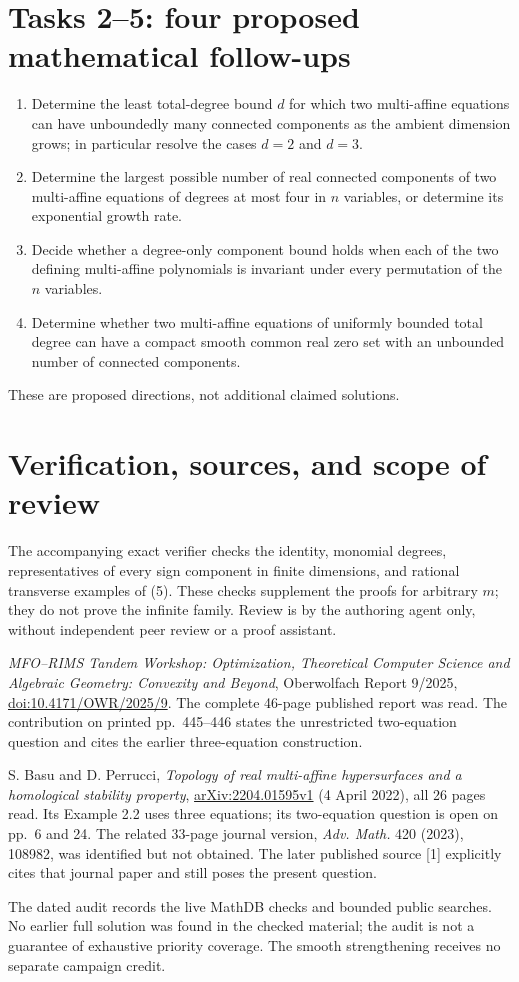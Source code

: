 \documentclass[11pt]{article}
\begin{document}
\section*{Tasks 2--5: four proposed mathematical follow-ups}
\begin{enumerate}[label=\textbf{Task \arabic*:},start=2,leftmargin=*]
\item Determine the least total-degree bound \(d\) for which two
multi-affine equations can have unboundedly many connected
components as the ambient dimension grows; in particular resolve
the cases \(d=2\) and \(d=3\).
\item Determine the largest possible number of real connected
components of two multi-affine equations of degrees at most four
in \(n\) variables, or determine its exponential growth rate.
\item Decide whether a degree-only component bound holds when
each of the two defining multi-affine polynomials is invariant
under every permutation of the \(n\) variables.
\item Determine whether two multi-affine equations of uniformly
bounded total degree can have a compact smooth common real zero
set with an unbounded number of connected components.
\end{enumerate}
These are proposed directions, not additional claimed solutions.

\section*{Verification, sources, and scope of review}
The accompanying exact verifier checks the identity, monomial
degrees, representatives of every sign component in finite
dimensions, and rational transverse examples of (5). These checks
supplement the proofs for arbitrary \(m\); they do not prove the
infinite family. Review is by the authoring agent only, without
independent peer review or a proof assistant.

\medskip\noindent
[1] \emph{MFO--RIMS Tandem Workshop: Optimization, Theoretical
Computer Science and Algebraic Geometry: Convexity and Beyond},
Oberwolfach Report 9/2025,
\href{https://doi.org/10.4171/OWR/2025/9}{doi:10.4171/OWR/2025/9}.
The complete 46-page published report was read. The contribution
on printed pp.~445--446 states the unrestricted two-equation
question and cites the earlier three-equation construction.

\medskip\noindent
[2] S. Basu and D. Perrucci,
\emph{Topology of real multi-affine hypersurfaces and a
homological stability property},
\href{https://arxiv.org/abs/2204.01595}{arXiv:2204.01595v1}
(4 April 2022), all 26 pages read.
Its Example 2.2 uses three equations; its two-equation question
is open on pp.~6 and 24.
The related 33-page journal version, \emph{Adv. Math.} 420 (2023),
108982, was identified but not obtained.
The later published source [1] explicitly cites that journal
paper and still poses the present question.

\medskip\noindent
The dated audit records the live MathDB checks and bounded
public searches. No earlier full solution was found in the
checked material; the audit is not a guarantee of exhaustive
priority coverage. The smooth strengthening receives no separate
campaign credit.
\end{document}
